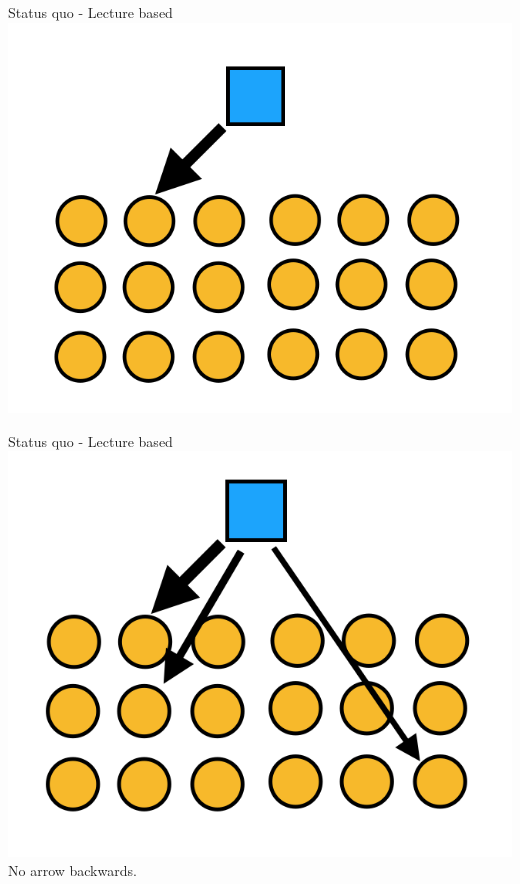 \documentclass{beamer}
\begin{document}
\begin{frame}{Status quo - Lecture based}
  \centering
    \includegraphics[scale=0.5]{lecturestyle3}
\end{frame}
\begin{frame}{Status quo - Lecture based}
  \centering
    \includegraphics[scale=0.5]{lecturestyle2}\\
    \pause No arrow backwards.
\end{frame}
\end{document}
